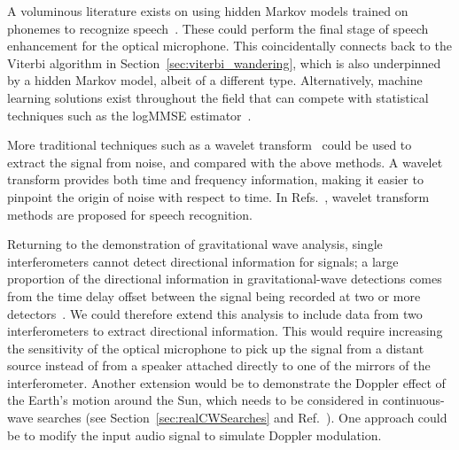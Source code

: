\documentclass[paper-main.tex]{subfiles}
\begin{document}
A voluminous literature exists on using hidden Markov models trained on phonemes to recognize speech~\cite{HMM_english}. 
These could perform the final stage of speech enhancement for the optical microphone. 
This coincidentally connects back to the Viterbi algorithm in Section~\ref{sec:viterbi_wandering}, which is also underpinned by a hidden Markov model, albeit of a different type. Alternatively, machine learning solutions exist throughout the field that can compete with statistical techniques such as the logMMSE estimator~\cite{SEGAN}.


More traditional techniques such as a wavelet transform~\citep{nason1995stationary} could be used to extract the signal from noise, and compared with the above methods. 
A wavelet transform provides both time and frequency information, making it easier to pinpoint the origin of noise with respect to time. 
In Refs.~\cite{tufekci2000feature,agbinya1996discrete}, wavelet transform methods are proposed for speech recognition. 


Returning to the demonstration of gravitational wave analysis, single interferometers cannot detect directional information for signals; a large proportion of the directional information in gravitational-wave detections comes from the time delay offset between the signal being recorded at two or more detectors~\cite{GW150914}.
We could therefore extend this analysis to include data from two interferometers to extract directional information.
This would require increasing the sensitivity of the optical microphone to pick up the signal from a distant source instead of from a speaker attached directly to one of the mirrors of the interferometer.
Another extension would be to demonstrate the Doppler effect of the Earth's motion around the Sun, which needs to be considered in continuous-wave searches (see Section~\ref{sec:realCWSearches} and Ref.~\cite{JKS:1998}). 
One approach could be to modify the input audio signal to simulate Doppler modulation. 
\end{document}
